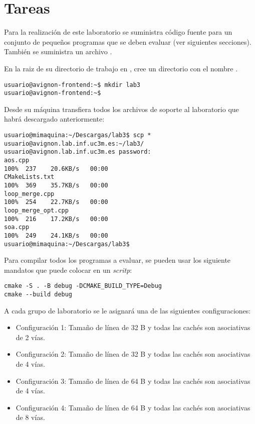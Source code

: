 \section{Tareas}

Para la realización de este laboratorio se suministra código fuente para un
conjunto de pequeños programas que se deben evaluar (ver siguientes secciones).
También se suministra un archivo .

En la raiz de su directorio de trabajo en , cree un
directorio con el nombre .

\begin{lstlisting}[style=terminal,aboveskip=1em,belowskip=1em]
usuario@avignon-frontend:~$ mkdir lab3
usuario@avignon-frontend:~$
\end{lstlisting}

Desde su máquina transfiera todos los archivos de soporte al laboratorio
que habrá descargado anteriormente:

\begin{lstlisting}[style=terminal,aboveskip=1em,belowskip=1em]
usuario@mimaquina:~/Descargas/lab3$ scp * usuario@avignon.lab.inf.uc3m.es:~/lab3/
usuario@avignon.lab.inf.uc3m.es password: 
aos.cpp                                                            100%  237    20.6KB/s   00:00    
CMakeLists.txt                                                     100%  369    35.7KB/s   00:00    
loop_merge.cpp                                                     100%  254    22.7KB/s   00:00    
loop_merge_opt.cpp                                                 100%  216    17.2KB/s   00:00    
soa.cpp                                                            100%  249    24.1KB/s   00:00    
usuario@mimaquina:~/Descargas/lab3$ 
\end{lstlisting}

Para compilar todos los programas a evaluar, se pueden usar los siguiente mandatos
que puede colocar en un \emph{scritp}:

\begin{lstlisting}[style=terminal,aboveskip=1em,belowskip=1em]
cmake -S . -B debug -DCMAKE_BUILD_TYPE=Debug
cmake --build debug
\end{lstlisting}

A cada grupo de laboratorio se le asignará una de las siguientes configuraciones:
\begin{itemize}
\item Configuración 1:
Tamaño de línea de 32 B y todas las cachés son asociativas de 2 vías.
\item Configuración 2:
Tamaño de línea de 32 B y todas las cachés son asociativas de 4 vías.
\item Configuración 3:
Tamaño de línea de 64 B y todas las cachés son asociativas de 4 vías.
\item Configuración 4:
Tamaño de línea de 64 B y todas las cachés son asociativas de 8 vías.
\end{itemize}



